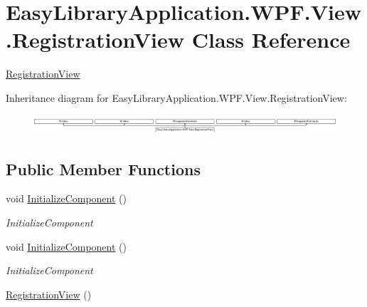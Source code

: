 \hypertarget{class_easy_library_application_1_1_w_p_f_1_1_view_1_1_registration_view}{}\section{Easy\+Library\+Application.\+W\+P\+F.\+View.\+Registration\+View Class Reference}
\label{class_easy_library_application_1_1_w_p_f_1_1_view_1_1_registration_view}


\mbox{\hyperlink{class_easy_library_application_1_1_w_p_f_1_1_view_1_1_registration_view}{Registration\+View}}  


Inheritance diagram for Easy\+Library\+Application.\+W\+P\+F.\+View.\+Registration\+View\+:\begin{figure}[H]
\begin{center}
\leavevmode
\includegraphics[height=0.715655cm]{class_easy_library_application_1_1_w_p_f_1_1_view_1_1_registration_view}
\end{center}
\end{figure}
\subsection*{Public Member Functions}
\begin{DoxyCompactItemize}
\item 
void \mbox{\hyperlink{class_easy_library_application_1_1_w_p_f_1_1_view_1_1_registration_view_aa25bafc8023f60dcefa7527fbda43b3e}{Initialize\+Component}} ()
\begin{DoxyCompactList}\small\item\em Initialize\+Component \end{DoxyCompactList}\item 
void \mbox{\hyperlink{class_easy_library_application_1_1_w_p_f_1_1_view_1_1_registration_view_aa25bafc8023f60dcefa7527fbda43b3e}{Initialize\+Component}} ()
\begin{DoxyCompactList}\small\item\em Initialize\+Component \end{DoxyCompactList}\item 
\mbox{\hyperlink{class_easy_library_application_1_1_w_p_f_1_1_view_1_1_registration_view_ad3342df790f2d04902cb17ecba14dcf5}{Registration\+View}} ()
\end{DoxyCompactItemize}


